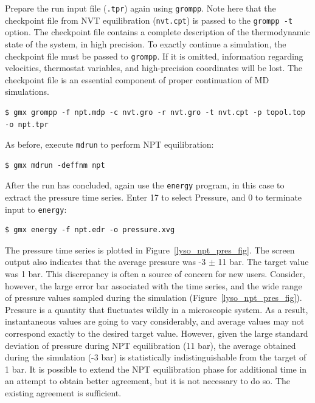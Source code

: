 \documentclass[9pt,tutorial,pubversion]{livecoms}
\begin{document}
Prepare the run input file (\texttt{.tpr}) again using \texttt{grompp}. Note here that the checkpoint file from NVT equilibration (\texttt{nvt.cpt}) is passed to the \texttt{grompp -t} option. The checkpoint file contains a complete description of the thermodynamic state of the system, in high precision. To exactly continue a simulation, the checkpoint file must be passed to \texttt{grompp}. If it is omitted, information regarding velocities, thermostat variables, and high-precision coordinates will be lost. The checkpoint file is an essential component of proper continuation of MD simulations.

\begin{lstlisting}
$ gmx grompp -f npt.mdp -c nvt.gro -r nvt.gro -t nvt.cpt -p topol.top -o npt.tpr
\end{lstlisting}

As before, execute \texttt{mdrun} to perform NPT equilibration:

\begin{lstlisting}
$ gmx mdrun -deffnm npt
\end{lstlisting}

After the run has concluded, again use the \texttt{energy} program, in this case to extract the pressure time series. Enter 17 to select Pressure, and 0 to terminate input to \texttt{energy}:

\begin{lstlisting}
$ gmx energy -f npt.edr -o pressure.xvg
\end{lstlisting}

The pressure time series is plotted in Figure~\ref{lyso_npt_pres_fig}. The screen output also indicates that the average pressure was -3 $\pm$ 11 bar. The target value was 1 bar. This discrepancy is often a source of concern for new users. Consider, however, the large error bar associated with the time series, and the wide range of pressure values sampled during the simulation (Figure~\ref{lyso_npt_pres_fig}). Pressure is a quantity that fluctuates wildly in a microscopic system. As a result, instantaneous values are going to vary considerably, and average values may not correspond exactly to the desired target value. However, given the large standard deviation of pressure during NPT equilibration (11 bar), the average obtained during the simulation (-3 bar) is statistically indistinguishable from the target of 1 bar. It is possible to extend the NPT equilibration phase for additional time in an attempt to obtain better agreement, but it is not necessary to do so. The existing agreement is sufficient.
\end{document}
